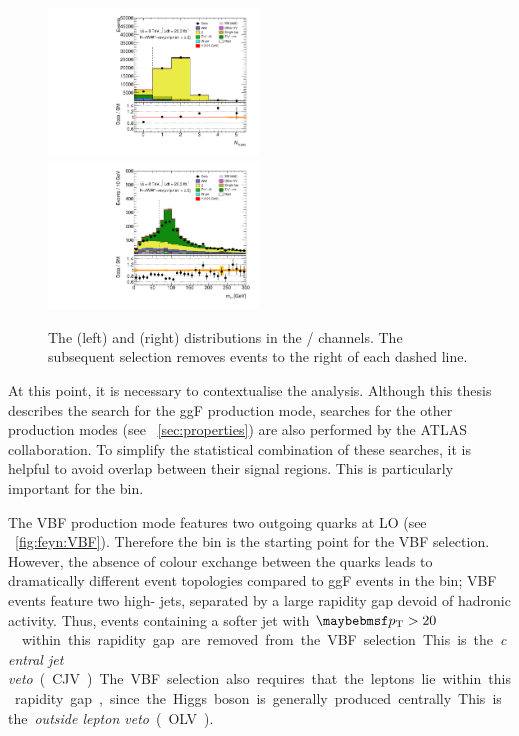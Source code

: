 \begin{figure}[t]
	\includegraphics[width=0.495\textwidth]{tex/selection/emme_CutFailVBF_2jetincl_nJets_Pt20_MV1_85_mh125_lin}
	\hfill
	\includegraphics[width=0.495\textwidth]{tex/selection/emme_CutFailVBFbVeto_2jetincl_Mtt_TrackHWW_Clj_mh125_lin}
	\caption{The \nbjets (left) and \mtautau (right) distributions in the \emch/\mech 
	channels. The subsequent selection removes events to the right of each dashed line.}
	\label{fig:sel:2j:df_cuts}
\end{figure}

At this point, it is necessary to contextualise the analysis. Although this thesis 
describes the search for the ggF production mode, searches for the other production modes 
(see \Section~\ref{sec:properties}) are also performed by the ATLAS collaboration. To 
simplify the statistical combination of these searches, it is helpful to avoid overlap 
between their signal regions. This is particularly important for the \twojet bin.

The VBF production mode features two outgoing quarks at LO (see \Figure~\ref{fig:feyn:VBF}). 
Therefore the \twojet bin is the starting point for the VBF selection. However, the 
absence of colour exchange between the quarks leads to dramatically different event 
topologies compared to ggF events in the \twojet bin; VBF events feature two high-\pt 
jets, separated by a large rapidity gap devoid of hadronic activity. Thus, events 
containing a softer jet with \unit{$\pt > 20$}{\GeV} within this rapidity gap are removed 
from the VBF selection. This is the \textit{central jet veto} (CJV). The VBF selection 
also requires that the leptons lie within this rapidity gap, since the Higgs boson is 
generally produced centrally. This is the \textit{outside lepton veto} (OLV). 

